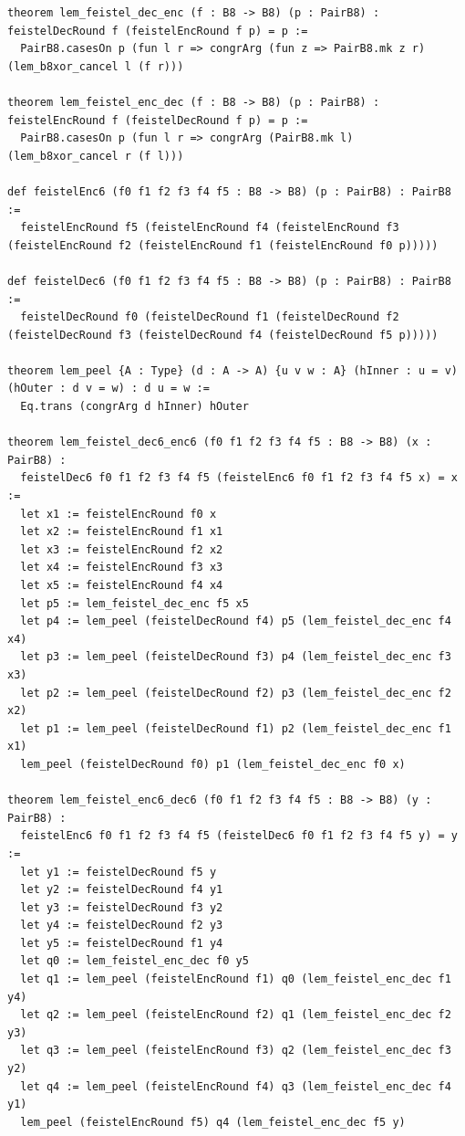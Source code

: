 \documentclass[10pt,twocolumn]{article}
\theoremstyle{spectralthm}
\begin{document}
\begin{lstlisting}[language=Lean4,caption={Standalone Pure Init.Prelude Term-Mode Lean 4 Expansion (thm30--thm37, v1.1.0, 0 sorry, 0 axioms).},label={lst:lean_v110}]
theorem lem_feistel_dec_enc (f : B8 -> B8) (p : PairB8) : feistelDecRound f (feistelEncRound f p) = p :=
  PairB8.casesOn p (fun l r => congrArg (fun z => PairB8.mk z r) (lem_b8xor_cancel l (f r)))

theorem lem_feistel_enc_dec (f : B8 -> B8) (p : PairB8) : feistelEncRound f (feistelDecRound f p) = p :=
  PairB8.casesOn p (fun l r => congrArg (PairB8.mk l) (lem_b8xor_cancel r (f l)))

def feistelEnc6 (f0 f1 f2 f3 f4 f5 : B8 -> B8) (p : PairB8) : PairB8 :=
  feistelEncRound f5 (feistelEncRound f4 (feistelEncRound f3 (feistelEncRound f2 (feistelEncRound f1 (feistelEncRound f0 p)))))

def feistelDec6 (f0 f1 f2 f3 f4 f5 : B8 -> B8) (p : PairB8) : PairB8 :=
  feistelDecRound f0 (feistelDecRound f1 (feistelDecRound f2 (feistelDecRound f3 (feistelDecRound f4 (feistelDecRound f5 p)))))

theorem lem_peel {A : Type} (d : A -> A) {u v w : A} (hInner : u = v) (hOuter : d v = w) : d u = w :=
  Eq.trans (congrArg d hInner) hOuter

theorem lem_feistel_dec6_enc6 (f0 f1 f2 f3 f4 f5 : B8 -> B8) (x : PairB8) :
  feistelDec6 f0 f1 f2 f3 f4 f5 (feistelEnc6 f0 f1 f2 f3 f4 f5 x) = x :=
  let x1 := feistelEncRound f0 x
  let x2 := feistelEncRound f1 x1
  let x3 := feistelEncRound f2 x2
  let x4 := feistelEncRound f3 x3
  let x5 := feistelEncRound f4 x4
  let p5 := lem_feistel_dec_enc f5 x5
  let p4 := lem_peel (feistelDecRound f4) p5 (lem_feistel_dec_enc f4 x4)
  let p3 := lem_peel (feistelDecRound f3) p4 (lem_feistel_dec_enc f3 x3)
  let p2 := lem_peel (feistelDecRound f2) p3 (lem_feistel_dec_enc f2 x2)
  let p1 := lem_peel (feistelDecRound f1) p2 (lem_feistel_dec_enc f1 x1)
  lem_peel (feistelDecRound f0) p1 (lem_feistel_dec_enc f0 x)

theorem lem_feistel_enc6_dec6 (f0 f1 f2 f3 f4 f5 : B8 -> B8) (y : PairB8) :
  feistelEnc6 f0 f1 f2 f3 f4 f5 (feistelDec6 f0 f1 f2 f3 f4 f5 y) = y :=
  let y1 := feistelDecRound f5 y
  let y2 := feistelDecRound f4 y1
  let y3 := feistelDecRound f3 y2
  let y4 := feistelDecRound f2 y3
  let y5 := feistelDecRound f1 y4
  let q0 := lem_feistel_enc_dec f0 y5
  let q1 := lem_peel (feistelEncRound f1) q0 (lem_feistel_enc_dec f1 y4)
  let q2 := lem_peel (feistelEncRound f2) q1 (lem_feistel_enc_dec f2 y3)
  let q3 := lem_peel (feistelEncRound f3) q2 (lem_feistel_enc_dec f3 y2)
  let q4 := lem_peel (feistelEncRound f4) q3 (lem_feistel_enc_dec f4 y1)
  lem_peel (feistelEncRound f5) q4 (lem_feistel_enc_dec f5 y)


\end{lstlisting}
\end{document}
